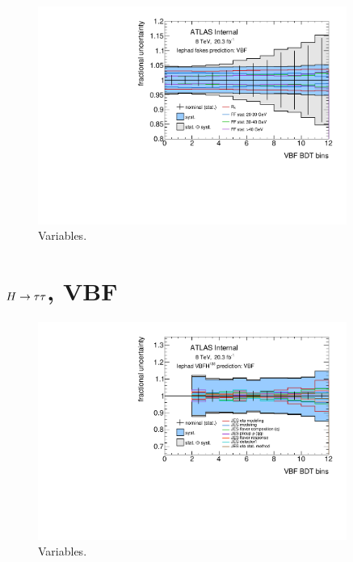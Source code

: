 \clearpage
\begin{figure}[tp]
  \includegraphics[width=0.90\textwidth]{figures/uncertainties/uncertainties_lephad_paper14_8TeV_fakes_VBF}
  \caption{Variables.}
  \label{fig:backgrounds-uncertainties-fakes}
\end{figure}

\clearpage
\section{$H\rightarrow\tau\tau$, VBF}
\label{sec:backgrounds-vbfhtautau}

\begin{figure}[tp]
  \includegraphics[width=0.90\textwidth]{figures/uncertainties/uncertainties_lephad_paper14_8TeV_VBFH125_JES_VBF}
  \caption{Variables.}
  \label{fig:backgrounds-uncertainties-vbfjes}
\end{figure}

